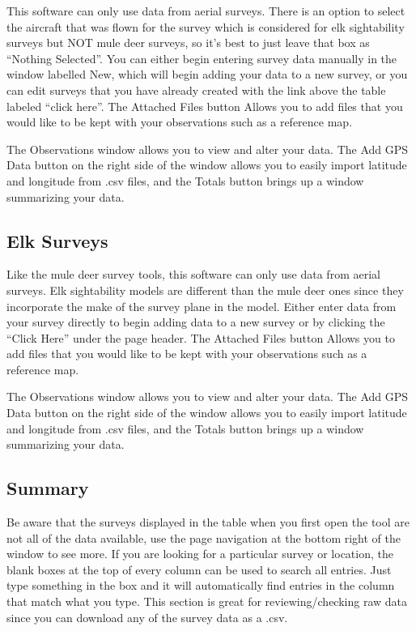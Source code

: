 \documentclass[
]{book}
\begin{document}
This software can only use data from aerial surveys. There is an option to select the aircraft that was flown for the survey which is considered for elk sightability surveys but NOT mule deer surveys, so it's best to just leave that box as ``Nothing Selected''. You can either begin entering survey data manually in the window labelled New, which will begin adding your data to a new survey, or you can edit surveys that you have already created with the link above the table labeled ``click here''. The Attached Files button Allows you to add files that you would like to be kept with your observations such as a reference map.

The Observations window allows you to view and alter your data. The Add GPS Data button on the right side of the window allows you to easily import latitude and longitude from .csv files, and the Totals button brings up a window summarizing your data.

\hypertarget{de-esurv}{%
\subsection{Elk Surveys}\label{de-esurv}}

Like the mule deer survey tools, this software can only use data from aerial surveys. Elk sightability models are different than the mule deer ones since they incorporate the make of the survey plane in the model. Either enter data from your survey directly to begin adding data to a new survey or by clicking the ``Click Here'' under the page header. The Attached Files button Allows you to add files that you would like to be kept with your observations such as a reference map.

The Observations window allows you to view and alter your data. The Add GPS Data button on the right side of the window allows you to easily import latitude and longitude from .csv files, and the Totals button brings up a window summarizing your data.

\hypertarget{de-summ}{%
\subsection{Summary}\label{de-summ}}

Be aware that the surveys displayed in the table when you first open the tool are not all of the data available, use the page navigation at the bottom right of the window to see more. If you are looking for a particular survey or location, the blank boxes at the top of every column can be used to search all entries. Just type something in the box and it will automatically find entries in the column that match what you type. This section is great for reviewing/checking raw data since you can download any of the survey data as a .csv.
\end{document}
